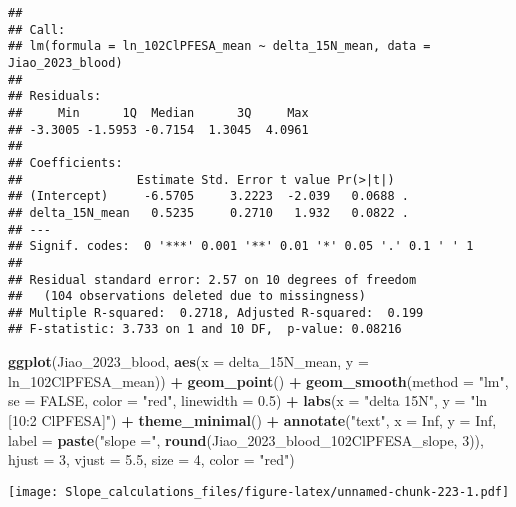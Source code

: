 \documentclass[
]{article}
\newenvironment{Shaded}{\begin{snugshade}}{\end{snugshade}}
\newcommand{\AttributeTok}[1]{\textcolor[rgb]{0.13,0.29,0.53}{#1}}
\newcommand{\ConstantTok}[1]{\textcolor[rgb]{0.56,0.35,0.01}{#1}}
\newcommand{\DecValTok}[1]{\textcolor[rgb]{0.00,0.00,0.81}{#1}}
\newcommand{\FloatTok}[1]{\textcolor[rgb]{0.00,0.00,0.81}{#1}}
\newcommand{\FunctionTok}[1]{\textcolor[rgb]{0.13,0.29,0.53}{\textbf{#1}}}
\newcommand{\NormalTok}[1]{#1}
\newcommand{\SpecialCharTok}[1]{\textcolor[rgb]{0.81,0.36,0.00}{\textbf{#1}}}
\newcommand{\StringTok}[1]{\textcolor[rgb]{0.31,0.60,0.02}{#1}}
\begin{document}
\begin{verbatim}
## 
## Call:
## lm(formula = ln_102ClPFESA_mean ~ delta_15N_mean, data = Jiao_2023_blood)
## 
## Residuals:
##     Min      1Q  Median      3Q     Max 
## -3.3005 -1.5953 -0.7154  1.3045  4.0961 
## 
## Coefficients:
##                Estimate Std. Error t value Pr(>|t|)  
## (Intercept)     -6.5705     3.2223  -2.039   0.0688 .
## delta_15N_mean   0.5235     0.2710   1.932   0.0822 .
## ---
## Signif. codes:  0 '***' 0.001 '**' 0.01 '*' 0.05 '.' 0.1 ' ' 1
## 
## Residual standard error: 2.57 on 10 degrees of freedom
##   (104 observations deleted due to missingness)
## Multiple R-squared:  0.2718, Adjusted R-squared:  0.199 
## F-statistic: 3.733 on 1 and 10 DF,  p-value: 0.08216
\end{verbatim}

\begin{Shaded}
\begin{Highlighting}[]
\FunctionTok{ggplot}\NormalTok{(Jiao\_2023\_blood, }\FunctionTok{aes}\NormalTok{(}\AttributeTok{x =}\NormalTok{ delta\_15N\_mean, }\AttributeTok{y =}\NormalTok{ ln\_102ClPFESA\_mean)) }\SpecialCharTok{+}
  \FunctionTok{geom\_point}\NormalTok{() }\SpecialCharTok{+}
  \FunctionTok{geom\_smooth}\NormalTok{(}\AttributeTok{method =} \StringTok{"lm"}\NormalTok{, }\AttributeTok{se =} \ConstantTok{FALSE}\NormalTok{, }\AttributeTok{color =} \StringTok{"red"}\NormalTok{, }\AttributeTok{linewidth =} \FloatTok{0.5}\NormalTok{) }\SpecialCharTok{+}
  \FunctionTok{labs}\NormalTok{(}\AttributeTok{x =} \StringTok{"delta 15N"}\NormalTok{,}
       \AttributeTok{y =} \StringTok{"ln [10:2 ClPFESA]"}\NormalTok{) }\SpecialCharTok{+}
  \FunctionTok{theme\_minimal}\NormalTok{() }\SpecialCharTok{+}
  \FunctionTok{annotate}\NormalTok{(}\StringTok{"text"}\NormalTok{, }\AttributeTok{x =} \ConstantTok{Inf}\NormalTok{, }\AttributeTok{y =} \ConstantTok{Inf}\NormalTok{, }\AttributeTok{label =} \FunctionTok{paste}\NormalTok{(}\StringTok{"slope ="}\NormalTok{, }\FunctionTok{round}\NormalTok{(Jiao\_2023\_blood\_102ClPFESA\_slope, }\DecValTok{3}\NormalTok{)), }
           \AttributeTok{hjust =} \DecValTok{3}\NormalTok{, }\AttributeTok{vjust =} \FloatTok{5.5}\NormalTok{, }\AttributeTok{size =} \DecValTok{4}\NormalTok{, }\AttributeTok{color =} \StringTok{"red"}\NormalTok{)}
\end{Highlighting}
\end{Shaded}

\texttt{[image: Slope\_calculations\_files/figure-latex/unnamed-chunk-223-1.pdf]}
\end{document}
